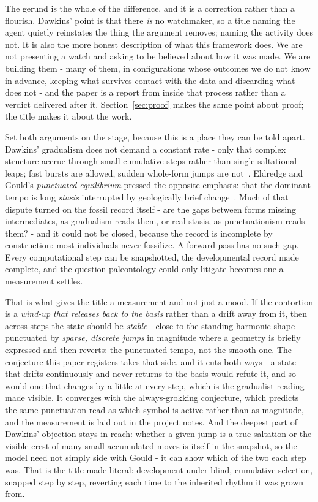 The gerund is the whole of the difference, and it is a correction rather than a flourish. Dawkins' point is that there \textit{is} no watchmaker, so a title naming the agent quietly reinstates the thing the argument removes; naming the activity does not. It is also the more honest description of what this framework does. We are not presenting a watch and asking to be believed about how it was made. We are building them - many of them, in configurations whose outcomes we do not know in advance, keeping what survives contact with the data and discarding what does not - and the paper is a report from inside that process rather than a verdict delivered after it. Section~\ref{sec:proof} makes the same point about proof; the title makes it about the work.

Set both arguments on the stage, because this is a place they can be told apart. Dawkins' gradualism does not demand a constant rate - only that complex structure accrue through small cumulative steps rather than single saltational leaps; fast bursts are allowed, sudden whole-form jumps are not~\cite{dawkins1986}. Eldredge and Gould's \textit{punctuated equilibrium} pressed the opposite emphasis: that the dominant tempo is long \textit{stasis} interrupted by geologically brief change~\cite{eldredge1972}. Much of that dispute turned on the fossil record itself - are the gaps between forms missing intermediates, as gradualism reads them, or real stasis, as punctuationism reads them? - and it could not be closed, because the record is incomplete by construction: most individuals never fossilize. A forward pass has no such gap. Every computational step can be snapshotted, the developmental record made complete, and the question paleontology could only litigate becomes one a measurement settles.

That is what gives the title a measurement and not just a mood. If the contortion is a \textit{wind-up that releases back to the basis} rather than a drift away from it, then across steps the state should be \textit{stable} - close to the standing harmonic shape - punctuated by \textit{sparse, discrete jumps} in magnitude where a geometry is briefly expressed and then reverts: the punctuated tempo, not the smooth one. The conjecture this paper registers takes that side, and it cuts both ways - a state that drifts continuously and never returns to the basis would refute it, and so would one that changes by a little at every step, which is the gradualist reading made visible. It converges with the always-grokking conjecture, which predicts the same punctuation read as which symbol is active rather than as magnitude, and the measurement is laid out in the project notes. And the deepest part of Dawkins' objection stays in reach: whether a given jump is a true saltation or the visible crest of many small accumulated moves is itself in the snapshot, so the model need not simply side with Gould - it can show which of the two each step was. That is the title made literal: development under blind, cumulative selection, snapped step by step, reverting each time to the inherited rhythm it was grown from.


